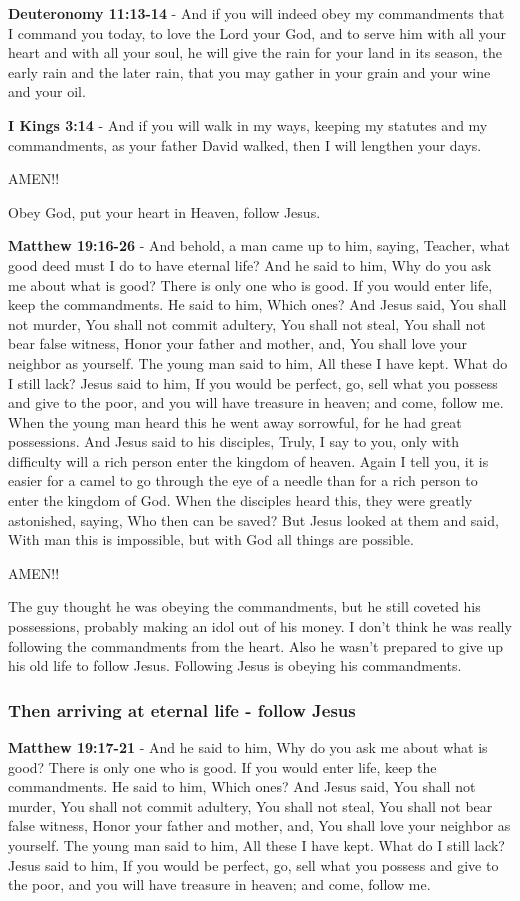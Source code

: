 \documentclass[11pt]{article}
\begin{document}
\textbf{Deuteronomy 11:13-14} - And if you will indeed obey my commandments that I command you today, to love the Lord your God, and to serve him with all your heart and with all your soul, he will give the rain for your land in its season, the early rain and the later rain, that you may gather in your grain and your wine and your oil.

\textbf{I Kings 3:14} - And if you will walk in my ways, keeping my statutes and my commandments, as your father David walked, then I will lengthen your days.

AMEN!!

Obey God, put your heart in Heaven, follow Jesus.

\textbf{Matthew 19:16-26} - And behold, a man came up to him, saying, Teacher, what good deed must I do to have eternal life? And he said to him, Why do you ask me about what is good? There is only one who is good. If you would enter life, keep the commandments. He said to him, Which ones? And Jesus said, You shall not murder, You shall not commit adultery, You shall not steal, You shall not bear false witness, Honor your father and mother, and, You shall love your neighbor as yourself. The young man said to him, All these I have kept. What do I still lack? Jesus said to him, If you would be perfect, go, sell what you possess and give to the poor, and you will have treasure in heaven; and come, follow me. When the young man heard this he went away sorrowful, for he had great possessions. And Jesus said to his disciples, Truly, I say to you, only with difficulty will a rich person enter the kingdom of heaven. Again I tell you, it is easier for a camel to go through the eye of a needle than for a rich person to enter the kingdom of God. When the disciples heard this, they were greatly astonished, saying, Who then can be saved? But Jesus looked at them and said, With man this is impossible, but with God all things are possible.

AMEN!!

The guy thought he was obeying the commandments, but he still coveted his possessions, probably making an idol out of his money.
I don't think he was really following the commandments from the heart.
Also he wasn't prepared to give up his old life to follow Jesus.
Following Jesus is obeying his commandments.

\subsubsection{Then arriving at eternal life - follow Jesus}
\label{sec:orgae9e5ac}
\textbf{Matthew 19:17-21} - And he said to him, Why do you ask me about what is good? There is only one who is good. If you would enter life, keep the commandments. He said to him, Which ones? And Jesus said, You shall not murder, You shall not commit adultery, You shall not steal, You shall not bear false witness, Honor your father and mother, and, You shall love your neighbor as yourself. The young man said to him, All these I have kept. What do I still lack? Jesus said to him, If you would be perfect, go, sell what you possess and give to the poor, and you will have treasure in heaven; and come, follow me.
\end{document}
